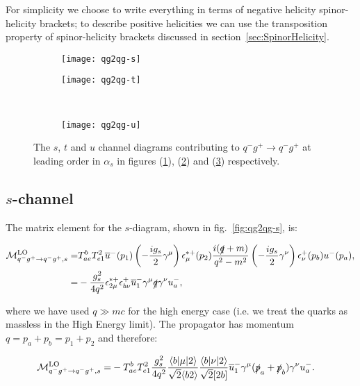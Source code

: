 	For simplicity we choose to write everything in terms of negative helicity spinor-helicity brackets;
	to describe positive helicities we can use the transposition property of spinor-helicity brackets discussed
	in section~\ref{sec:SpinorHelicity}.

	\begin{figure}[h]
		\centering
		\begin{subfigure}[b]{0.3\textwidth}
			\texttt{[image: qg2qg-s]}
			\caption{}
			\label{fig:qg2qg-s}
		\end{subfigure}

		\begin{subfigure}[b]{0.3\textwidth}
			\texttt{[image: qg2qg-t]}
			\caption{}
			\label{fig:qg2qg-t}
		\end{subfigure}
		~
		\begin{subfigure}[b]{0.3\textwidth}
			\texttt{[image: qg2qg-u]}
			\caption{}
			\label{fig:qg2qg-u}
		\end{subfigure}
		\caption{The $s$, $t$ and $u$ channel diagrams contributing to $q^-g^+\to q^-g^+$ at leading
		         order in $\alpha_s$ in figures (\ref{fig:qg2qg-s}), (\ref{fig:qg2qg-t}) and (\ref{fig:qg2qg-u})
		         respectively.}
		\label{fig:TwoToTwo2}
	\end{figure}

	\subsection{$s$-channel}

		The matrix element for the $s$-diagram, shown in fig.~\eqref{fig:qg2qg-s}, is:

		\begin{align}
			\mathcal{M}_{q^-g^+\to q^-g^+, s}^{\text{LO}}=&T^b_{ae}T^2_{e1}\overline{u}^-(p_1)\left(-\frac{ig_s}{2}\gamma^\mu\right)\epsilon_\mu^{*+}(p_2)
				\frac{i(\slashed q+m)}{q^2-m^2}\left(-\frac{ig_s}{2}\gamma^\nu\right)\epsilon^+_\nu(p_b)u^-(p_a), \\
			=&-\frac{g^2_s}{4q^2}\epsilon^{*+}_{2\mu}\epsilon^+_{b\nu}\overline{u}^-_1\gamma^\mu\slashed q\gamma^\nu u^-_a,
		\end{align}

		where we have used $q\gg mc$ for the high energy case (i.e. we treat the quarks as massless in the High Energy limit).
		The propagator has momentum $q=p_a+p_b=p_1+p_2$ and therefore:

		\begin{align}
			\mathcal{M}_{q^-g^+\to q^-g^+, s}^{\text{LO}}=&-T^b_{ae}T^2_{e1}\frac{g^2_s}{4q^2}\frac{\langle{b}|\mu|2\rangle}{\sqrt{2}\langle{b2\rangle}}
			\frac{\langle{b}|\nu|2\rangle}{\sqrt{2}[2b]}\overline{u}^-_1\gamma^\mu(\slashed{p}_a+\slashed{p}_b)\gamma^\nu u^-_a.
		\end{align}


